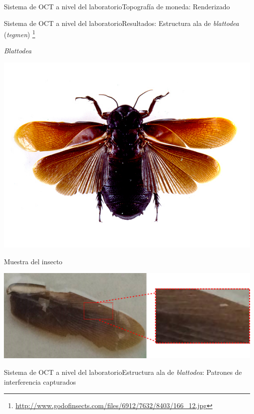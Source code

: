 \documentclass[fleqn,10pt]{beamer}
\newcommand\blfootnote[1]{%
	\begingroup
	\renewcommand\thefootnote{}\footnote{#1}%
	\addtocounter{footnote}{-1}%
	\endgroup
}
\begin{document}
\begin{frame}{Sistema de OCT a nivel del laboratorio}{Topografía de moneda: Renderizado}
	
\end{frame}


\begin{frame}{Sistema de OCT a nivel del laboratorio}{Resultados: Estructura ala de \emph{blattodea} (\emph{tegmen})}
	\blfootnote{{\tiny \url{http://www.godofinsects.com/files/6912/7632/8403/166_12.jpg}}}
	{\centering
	\emph{Blattodea}
	
	\includegraphics[width=0.4\linewidth]{AAUgraphics/pt2/166_12} \par}
	
	Muestra del insecto
	
	{\centering
	\includegraphics[width=1\linewidth]{AAUgraphics/pt2/BlattoaWingZoomed}}
\end{frame}

\begin{frame}{Sistema de OCT a nivel del laboratorio}{Estructura ala de \emph{blattodea}: Patrones de interferencia capturados}
	
	\vfill
	\begin{center}
	\end{center}
\end{frame}
\end{document}
